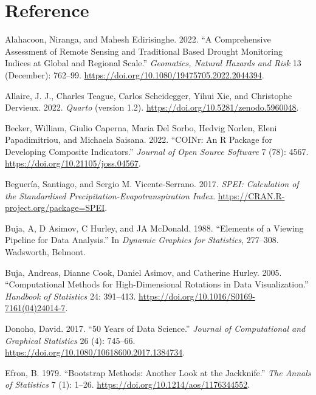 \documentclass[
]{interact}
\newlength{\cslhangindent}
\newenvironment{CSLReferences}[2] %
 {\begin{list}{}{%
  \setlength{\itemindent}{0pt}
  \setlength{\leftmargin}{0pt}
  \setlength{\parsep}{0pt}
  \ifodd #1
   \setlength{\leftmargin}{\cslhangindent}
   \setlength{\itemindent}{-1\cslhangindent}
  \fi
  \setlength{\itemsep}{#2\baselineskip}}}
 {\end{list}}
\begin{document}
\section*{Reference}\label{reference}

\label{refs}
\begin{CSLReferences}{1}{0}
Alahacoon, Niranga, and Mahesh Edirisinghe. 2022. {``A Comprehensive
Assessment of Remote Sensing and Traditional Based Drought Monitoring
Indices at Global and Regional Scale.''} \emph{Geomatics, Natural
Hazards and Risk} 13 (December): 762--99.
\url{https://doi.org/10.1080/19475705.2022.2044394}.

Allaire, J. J., Charles Teague, Carlos Scheidegger, Yihui Xie, and
Christophe Dervieux. 2022. \emph{{Quarto}} (version 1.2).
\url{https://doi.org/10.5281/zenodo.5960048}.

Becker, William, Giulio Caperna, Maria Del Sorbo, Hedvig Norlen, Eleni
Papadimitriou, and Michaela Saisana. 2022. {``COINr: An {R} Package for
Developing Composite Indicators.''} \emph{Journal of Open Source
Software} 7 (78): 4567. \url{https://doi.org/10.21105/joss.04567}.

Beguería, Santiago, and Sergio M. Vicente-Serrano. 2017. \emph{SPEI:
Calculation of the Standardised Precipitation-Evapotranspiration Index}.
\url{https://CRAN.R-project.org/package=SPEI}.

Buja, A, D Asimov, C Hurley, and JA McDonald. 1988. {``Elements of a
Viewing Pipeline for Data Analysis.''} In \emph{Dynamic Graphics for
Statistics}, 277--308. Wadsworth, Belmont.

Buja, Andreas, Dianne Cook, Daniel Asimov, and Catherine Hurley. 2005.
{``Computational Methods for High-Dimensional Rotations in Data
Visualization.''} \emph{Handbook of Statistics} 24: 391--413.
\url{https://doi.org/10.1016/S0169-7161(04)24014-7}.

Donoho, David. 2017. {``50 {Years} of {Data} {Science}.''} \emph{Journal
of Computational and Graphical Statistics} 26 (4): 745--66.
\url{https://doi.org/10.1080/10618600.2017.1384734}.

Efron, B. 1979. {``Bootstrap {Methods}: {Another} {Look} at the
{Jackknife}.''} \emph{The Annals of Statistics} 7 (1): 1--26.
\url{https://doi.org/10.1214/aos/1176344552}.


\end{CSLReferences}
\end{document}
